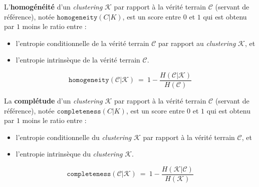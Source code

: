 		
		L'\textbf{homogénéité} d'un \textit{clustering} $\mathcal{K}$ par rapport à la vérité terrain $\mathcal{C}$ (servant de référence), notée $\texttt{homogeneity}(C|K)$, est un score entre $0$ et $1$ qui est obtenu par $1$ moins le ratio entre :
		\begin{itemize}
			\item l'entropie conditionnelle de la vérité terrain $\mathcal{C}$ par rapport au \textit{clustering} $\mathcal{K}$, et
			\item l'entropie intrinsèque de la vérité terrain $\mathcal{C}$.
		\end{itemize}
		
		\begin{equation}
			\label{equation:D.1-ANNEXE-EVALUATION-CLUSTERING-DEFINITION-HOMEGENEITE}
			\texttt{homogeneity}(\mathcal{C}|\mathcal{K})~=~
				1
				-
				\frac{
					H(\mathcal{C}|\mathcal{K})
				}{
					H(\mathcal{C})
				}
		\end{equation}
		
		La \textbf{complétude} d'un \textit{clustering} $\mathcal{K}$ par rapport à la vérité terrain $\mathcal{C}$ (servant de référence), notée $\texttt{completeness}(C|K)$, est un score entre $0$ et $1$ qui est obtenu par $1$ moins le ratio entre :
		\begin{itemize}
			\item l'entropie conditionnelle du \textit{clustering} $\mathcal{K}$ par rapport à la vérité terrain $\mathcal{C}$, et
			\item l'entropie intrinsèque du \textit{clustering} $\mathcal{K}$.
		\end{itemize}
		
		\begin{equation}
			\label{equation:D.1-ANNEXE-EVALUATION-CLUSTERING-DEFINITION-COMPLETENESS}
			\texttt{completeness}(\mathcal{C}|\mathcal{K})~=~
				1
				-
				\frac{
					H(\mathcal{K}|\mathcal{C})
				}{
					H(\mathcal{K})
				}
		\end{equation}
		

